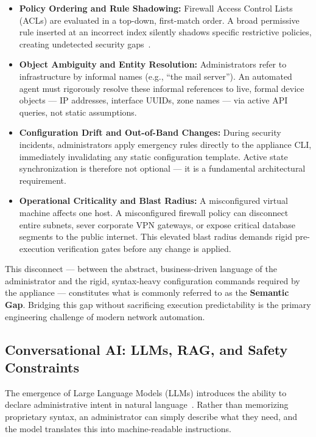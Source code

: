 \begin{itemize}
    \item \textbf{Policy Ordering and Rule Shadowing:} Firewall Access Control Lists (ACLs) are evaluated in a top-down, first-match order. A broad permissive rule inserted at an incorrect index silently shadows specific restrictive policies, creating undetected security gaps~\cite{yuan2006fireman}.
    \item \textbf{Object Ambiguity and Entity Resolution:} Administrators refer to infrastructure by informal names (e.g., ``the mail server''). An automated agent must rigorously resolve these informal references to live, formal device objects — IP addresses, interface UUIDs, zone names — via active API queries, not static assumptions.
    \item \textbf{Configuration Drift and Out-of-Band Changes:} During security incidents, administrators apply emergency rules directly to the appliance CLI, immediately invalidating any static configuration template. Active state synchronization is therefore not optional — it is a fundamental architectural requirement.
    \item \textbf{Operational Criticality and Blast Radius:} A misconfigured virtual machine affects one host. A misconfigured firewall policy can disconnect entire subnets, sever corporate VPN gateways, or expose critical database segments to the public internet. This elevated blast radius demands rigid pre-execution verification gates before any change is applied.
\end{itemize}

This disconnect — between the abstract, business-driven language of the administrator and the rigid, syntax-heavy configuration commands required by the appliance — constitutes what is commonly referred to as the \textbf{Semantic Gap}. Bridging this gap without sacrificing execution predictability is the primary engineering challenge of modern network automation.

\subsection{Conversational AI: LLMs, RAG, and Safety Constraints}
The emergence of Large Language Models (LLMs) introduces the ability to declare administrative intent in natural language~\cite{boutaba2018comprehensive}. Rather than memorizing proprietary syntax, an administrator can simply describe what they need, and the model translates this into machine-readable instructions.

